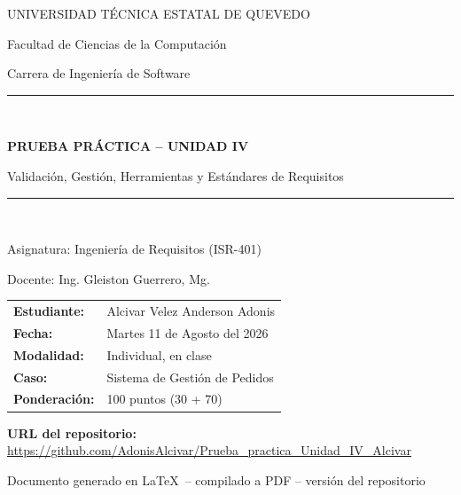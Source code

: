 \documentclass[11pt,a4paper]{article}
\begin{document}

\begin{titlepage}
\centering
\vspace*{1cm}

{\large UNIVERSIDAD TÉCNICA ESTATAL DE QUEVEDO\par}
{\normalsize Facultad de Ciencias de la Computación \par}
{\normalsize Carrera de Ingeniería de Software \par}

\vspace{1.2cm}
\rule{0.9\textwidth}{0.4pt}\\[0.4cm]

{\LARGE \bfseries PRUEBA PRÁCTICA -- UNIDAD IV \par}

\vspace{0.3cm}

{\Large Validación, Gestión, Herramientas y Estándares de Requisitos \par}

\rule{0.9\textwidth}{0.4pt}\\[1cm]

{\normalsize Asignatura: Ingeniería de Requisitos (ISR-401) \par}
{\normalsize Docente: Ing. Gleiston Guerrero, Mg. \par}

\vspace{0.6cm}

\begin{tabular}{ll}
\textbf{Estudiante:} & Alcivar Velez Anderson Adonis \\[0.4cm]
\textbf{Fecha:} & Martes 11 de Agosto del 2026 \\[0.4cm]
\textbf{Modalidad:} & Individual, en clase \\[0.4cm]
\textbf{Caso:} & Sistema de Gestión de Pedidos \\[0.4cm]
\textbf{Ponderación:} & 100 puntos (30 + 70) \\
\end{tabular}

\vspace{0.8cm}

{\large
\textbf{URL del repositorio:}\\
\url{https://github.com/AdonisAlcivar/Prueba_practica_Unidad_IV_Alcivar}
}

\vfill

{\small Documento generado en \LaTeX\ -- compilado a PDF -- versión del repositorio}

\end{titlepage}
\end{document}

